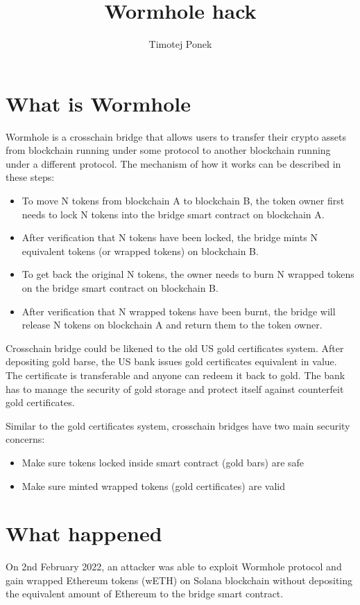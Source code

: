 \documentclass[fleqn,10pt]{olplainarticle}
\title{Wormhole hack}
\author{Timotej Ponek}
\affil{timotej.ponek@gmail.com}
\begin{document}
\flushbottom
\maketitle
\thispagestyle{empty}

\section*{What is Wormhole}
Wormhole is a crosschain bridge that allows users to transfer their crypto assets from blockchain running under some protocol to another blockchain running under a different protocol. The mechanism of how it works can be described in these steps\cite{linkedIn}:
\begin{itemize}
  \item To move N tokens from blockchain A to blockchain B, the token owner first needs to lock N tokens into the bridge smart contract on blockchain A.
  \item After verification that N tokens have been locked, the bridge mints N equivalent tokens (or wrapped tokens) on blockchain B.
  \item To get back the original N tokens, the owner needs to burn N wrapped tokens on the bridge smart contract on blockchain B.
  \item After verification that N wrapped tokens have been burnt, the bridge will release N tokens on blockchain A and return them to the token owner.
\end{itemize}

Crosschain bridge could be likened to the old US gold certificates system. After depositing gold barse, the US bank issues gold certificates equivalent in value. The certificate is transferable and anyone can redeem it back to gold. The bank has to manage the security of gold storage and protect itself against counterfeit gold certificates.

Similar to the gold certificates system, crosschain bridges have two main security concerns:

\begin{itemize}
  \item Make sure tokens locked inside smart contract (gold bars) are safe
  \item Make sure minted wrapped tokens (gold certificates) are valid
\end{itemize}

\section*{What happened}
On 2nd February 2022, an attacker was able to exploit Wormhole protocol and gain wrapped Ethereum tokens (wETH) on Solana blockchain without depositing the equivalent amount of Ethereum to the bridge smart contract.
\end{document}
